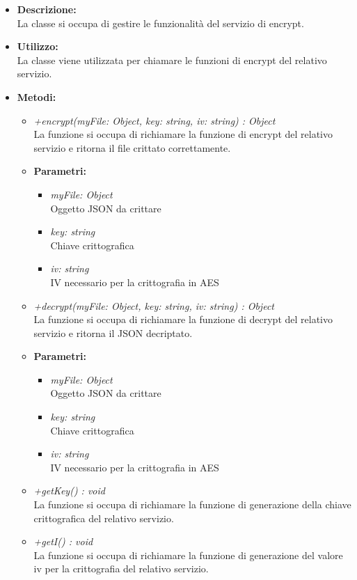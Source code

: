         \begin{itemize}
          \item \textbf{Descrizione: }\\
          La classe si occupa di gestire le funzionalità del servizio di encrypt.
          \item \textbf{Utilizzo: }\\
          La classe viene utilizzata per chiamare le funzioni di encrypt del relativo servizio.
          \item \textbf{Metodi:}\\
          \begin{itemize}
            \item \emph{+encrypt(myFile: Object, key: string, iv: string) : Object}\\
            La funzione si occupa di richiamare la funzione di encrypt del relativo servizio e ritorna il file crittato correttamente.
            \item \textbf{Parametri: }\\
            \begin{itemize}
              \item \emph{myFile: Object}\\
              Oggetto JSON da crittare
              \item \emph{key: string}\\
              Chiave crittografica
              \item \emph{iv: string}\\
              IV necessario per la crittografia in AES
            \end{itemize}
            \item \emph{+decrypt(myFile: Object, key: string, iv: string) : Object}\\
            La funzione si occupa di richiamare la funzione di decrypt del relativo servizio e ritorna il JSON decriptato.
            \item \textbf{Parametri: }\\
            \begin{itemize}
              \item \emph{myFile: Object}\\
              Oggetto JSON da crittare
              \item \emph{key: string}\\
              Chiave crittografica
              \item \emph{iv: string}\\
              IV necessario per la crittografia in AES
            \end{itemize}
            \item \emph{+getKey() : void}\\
            La funzione si occupa di richiamare la funzione di generazione della chiave crittografica del relativo servizio.
            \item \emph{+getI() : void}\\
            La funzione si occupa di richiamare la funzione di generazione del valore iv per la crittografia del relativo servizio.
          \end{itemize}
        \end{itemize}
